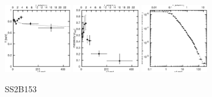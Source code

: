 \documentclass[structabstract]{aa}
\begin{document}
\begin{figure}[h]
   \centering
   \includegraphics[width=0.26\textwidth]{tprofile_ss2b.eps}
   \includegraphics[width=0.26\textwidth]{zprofile_ss2b.eps}
   \includegraphics[width=0.26\textwidth]{sbps_ss2b.eps}
   \caption{SS2B153}
   \label{fig:tprofss2b}%
\end{figure}
\end{document}
